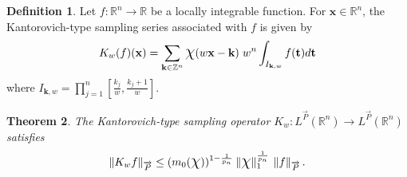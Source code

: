 \documentclass[11pt, a4paper]{article}
\newtheorem{thm}{Theorem}[section]
\theoremstyle{definition}
\newtheorem{defin}[thm]{Definition}
\numberwithin{equation}{section}
\def\ZZ{\mathbb Z}
\def\RR{\mathbb R}
\def\Chi{\mbox{\Large$\chi$}}
\begin{document}
\begin{defin}  
    Let $f:\RR^{n}\rightarrow\RR$ be a locally integrable function. For $\textbf{x} \in \RR^n$, the Kantorovich-type sampling series associated with $f$ is given by \cite{multi}  
    \begin{equation}\label{kan}
        K_{w}(f)(\textbf{x})=\sum_{\textbf{k}\in \ZZ^n}\Chi(w\textbf{x}-\textbf{k}) \hspace{3pt} w^{n} \int_{I_{\textbf{k},w}} f(\textbf{t})d\textbf{t} 
    \end{equation}
    where $I_{\textbf{k},w}=\prod\limits_{j=1}^{n}\left[\frac{k_j}{w},\frac{k_j+1}{w}\right].$
\end{defin} 


\begin{thm} \label{thm 4.2}
    The Kantorovich-type sampling operator $K_{w}: L^{\overrightarrow{P}}(\RR^{n})\rightarrow L^{\overrightarrow{P}}(\RR^{n}) $ satisfies 
    \begin{equation*}
		\|K_{w}f\|_{\overrightarrow{P}}\leq (m_0(\Chi))^{1-\frac{1}{p_n}}\hspace{2pt} \|\Chi\|_1^{\frac{1}{p_{n}}}\hspace{2pt} \left\|f \right\|_{\overrightarrow{P}}.
    \end{equation*}
\end{thm}
\end{document}
